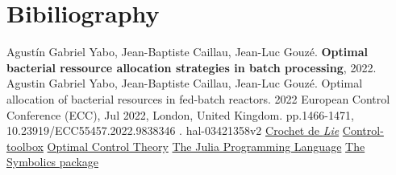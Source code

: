 \chapter{Bibiliography}
\begin{thebibliography}{}
    Agustín Gabriel Yabo, Jean-Baptiste Caillau, Jean-Luc Gouzé. \textbf{Optimal bacterial ressource allocation strategies
in batch processing}, 2022.
Agustin Gabriel Yabo, Jean-Baptiste Caillau, Jean-Luc Gouzé. Optimal allocation of bacterial resources in fed-batch reactors. 2022 European Control Conference (ECC), Jul 2022, London, United
Kingdom. pp.1466-1471, 10.23919/ECC55457.2022.9838346 . hal-03421358v2
    \href{https://fr.wikipedia.org/wiki/Crochet_de_Lie}{Crochet de \textit{Lie}}
    \href{https://control-toolbox.org/}{Control-toolbox}
    \href{https://en.wikipedia.org/wiki/Optimal_control}{Optimal Control Theory}
    \href{https://julialang.org/}{The Julia Programming Language}
    \href{https://symbolics.juliasymbolics.org/stable/}{The Symbolics package}
\end{thebibliography}
